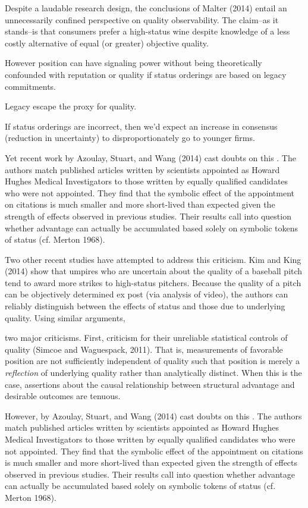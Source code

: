 Despite a laudable research design, the conclusions of Malter (2014) entail an unnecessarily confined perspective on quality observability. The claim--as it stands--is that consumers prefer a high-status wine despite knowledge of a less costly alternative of equal (or greater) objective quality. 

However position can have signaling power without being theoretically confounded with reputation or quality if status orderings are based on legacy commitments.

Legacy escape the proxy for quality.

If status orderings are incorrect, then we'd expect an increase in consensus (reduction in uncertainty) to disproportionately go to younger firms.


Yet
recent work by Azoulay, Stuart, and Wang (2014) cast doubts on this . The authors match published articles written by scientists appointed as Howard Hughes Medical Investigators to those written by equally qualified candidates who were not appointed. They find that the symbolic effect of the appointment on citations is much smaller and more short-lived than expected given the strength of effects observed in previous studies. Their results call into question whether advantage can actually be accumulated based solely on symbolic tokens of status (cf. Merton 1968).


 Two other recent studies have attempted to address this criticism. Kim and King (2014) show that umpires who are uncertain about the quality of a baseball pitch tend to award more strikes to high-status pitchers. Because the quality of a pitch can be objectively determined ex post (via analysis of video), the authors can reliably distinguish between the effects of status and those due to underlying quality. Using similar arguments, 

two major criticisms. First, criticism for their unreliable statistical controls of quality (Simcoe and Waguespack, 2011). That is, measurements of favorable position are not sufficiently independent of quality such that position is merely a {\it reflection} of underlying quality rather than analytically distinct. When this is the case, assertions about the causal relationship between structural advantage and desirable outcomes are tenuous. 



However, by Azoulay, Stuart, and Wang (2014) cast doubts on this . The authors match published articles written by scientists appointed as Howard Hughes Medical Investigators to those written by equally qualified candidates who were not appointed. They find that the symbolic effect of the appointment on citations is much smaller and more short-lived than expected given the strength of effects observed in previous studies. Their results call into question whether advantage can actually be accumulated based solely on symbolic tokens of status (cf. Merton 1968).

